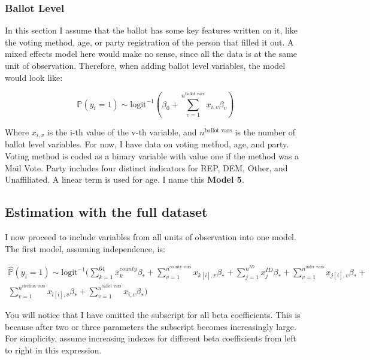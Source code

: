\documentclass[12pt,twoside]{reedthesis}
\begin{document}
  \subsubsection{Ballot Level}\label{ballot-level}
  
  In this section I assume that the ballot has some key features written
  on it, like the voting method, age, or party registration of the person
  that filled it out. A mixed effects model here would make no sense,
  since all the data is at the same unit of observation. Therefore, when
  adding ballot level variables, the model would look like:
  
  \begin{equation} \tag{Model 5}
  \hat{\mathbb{P}}(y_i = 1) \sim \text{logit}^{-1}(\beta_0 + \sum_{v = 1}^{n^{\text{ballot vars}}}x_{i,v}\beta_{v})
  \end{equation}
  
  Where \(x_{i,v}\) is the i-th value of the v-th variable, and
  \(n^{\text{ballot vars}}\) is the number of ballot level variables. For
  now, I have data on voting method, age, and party. Voting method is
  coded as a binary variable with value one if the method was a Mail Vote.
  Party includes four distinct indicators for REP, DEM, Other, and
  Unaffiliated. A linear term is used for age. I name this \textbf{Model
  5}.
  
  \subsection{Estimation with the full
  dataset}\label{estimation-with-the-full-dataset}
  
  I now proceed to include variables from all units of observation into
  one model. The first model, assuming independence, is:
  
  \begin{multline*}
  \hat{\mathbb{P}}(y_i = 1) \sim \text{logit}^{-1}(\sum_{k = 1}^{64}x_{k}^{county}\beta_{*} + \sum_{v=1}^{n^{\text{county vars}}}x_{k[i], v}\beta_{*} + \sum_{j = 1}^{n^{ID}}x_{j}^{ID}\beta_{*} + \sum_{v=1}^{n^{\text{indiv vars}}}x_{j[i], v}\beta_{*} + \\
  \sum_{v=1}^{n^{\text{election vars}}}x_{l[i], v}\beta_{*} + \sum_{v = 1}^{n^{\text{ballot vars}}}x_{i,v}\beta_{*})
  \end{multline*}
  
  You will notice that I have omitted the subscript for all beta
  coefficients. This is because after two or three parameters the
  subscript becomes increasingly large. For simplicity, assume increasing
  indexes for different beta coefficients from left to right in this
  expression.
  
\end{document}

